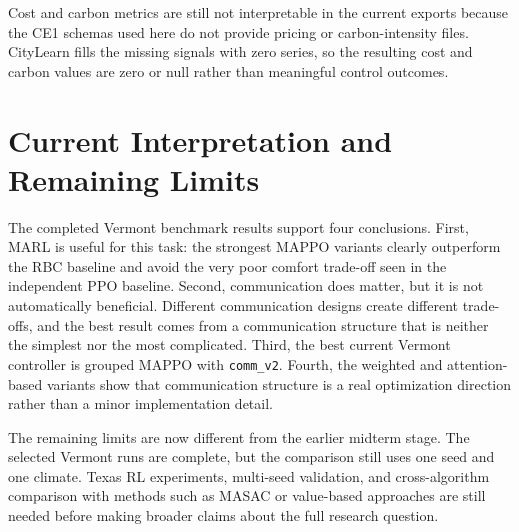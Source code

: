 Cost and carbon metrics are still not interpretable in the current exports
because the CE1 schemas used here do not provide pricing or carbon-intensity
files. CityLearn fills the missing signals with zero series, so the resulting
cost and carbon values are zero or null rather than meaningful control
outcomes.

\section{Current Interpretation and Remaining Limits}

The completed Vermont benchmark results support four conclusions. First, MARL is
useful for this task: the strongest MAPPO variants clearly outperform the RBC
baseline and avoid the very poor comfort trade-off seen in the independent PPO
baseline. Second, communication does matter, but it is not automatically
beneficial. Different communication designs create different trade-offs, and the
best result comes from a communication structure that is neither the simplest
nor the most complicated. Third, the best current Vermont controller is grouped
MAPPO with \texttt{comm\_v2}. Fourth, the weighted and attention-based variants
show that communication structure is a real optimization direction rather than a
minor implementation detail.

The remaining limits are now different from the earlier midterm stage. The
selected Vermont runs are complete, but the comparison still uses one seed and
one climate. Texas RL experiments, multi-seed validation, and cross-algorithm
comparison with methods such as MASAC or value-based approaches are still needed
before making broader claims about the full research question.
